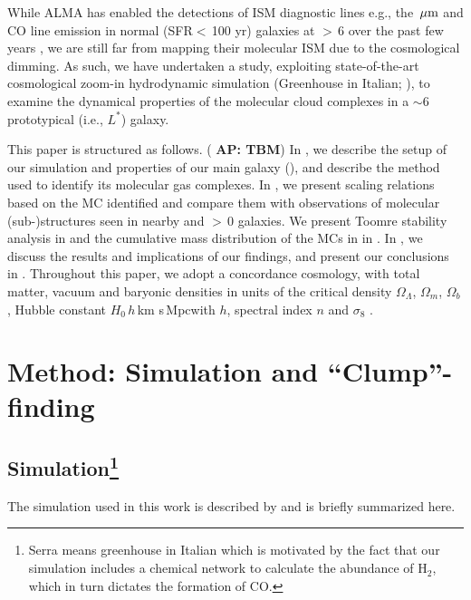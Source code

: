 \IfFileExists{emulateapjlegacy.cls}{\documentclass[iop]{emulateapjlegacy}}{\documentclass[iop]{emulateapj}}
\newcommand{\AP}[1]{({\bf \color{apcolor} AP: #1})}
\begin{document}
While ALMA has enabled the detections of
ISM diagnostic lines e.g., the \,$\mbox{$\mu$m}$ and CO line emission in
normal (SFR$<$\,100\,\Msun\,yr\pmOne) galaxies at \z$>$\,6 over the past few years \citep[e.g.,][]{Odorico18a, Carniani18b},
we are still far from mapping their molecular ISM due to the cosmological dimming.
As such, we have undertaken a study, exploiting
state-of-the-art cosmological zoom-in hydrodynamic simulation
 (Greenhouse in Italian; \citealt{Pallottini17a, Pallottini17b}), to examine
the dynamical properties of the molecular cloud complexes in a \z$\sim$6 prototypical (i.e., $L^*$) 
galaxy.

This paper is structured as follows.
\AP{TBM}
In , we describe the setup of our simulation and properties of our main galaxy (\flower),
and describe the method used to identify its molecular gas complexes.
In , we present scaling relations based on
the MC identified and compare them with observations of molecular
(sub-)structures seen in nearby and \z$>$\,0 galaxies.
We present Toomre stability analysis in  and
the cumulative mass distribution of the MCs in \flower in .
In , we discuss the results and implications of our findings,
and present our conclusions in .
Throughout this paper, we adopt a concordance cosmology, with total matter, vacuum and baryonic densities
in units of the critical density $\Omega_{\Lambda}$, $\Omega_m$, $\Omega_b$,
Hubble constant $H_0$\,$h$\,km s\pmOne\,Mpc\pmOne with $h$,
spectral index $n$ and $\sigma_8$ \citep{Planck14a}.


\section{Method: Simulation and ``Clump''-finding} \label{sec:sim}


\subsection{ Simulation\footnote{Serra means greenhouse in Italian which is motivated by the
fact that our simulation includes a chemical network to calculate the abundance of H$_2$, which in turn
dictates the formation of CO.
}}
The simulation used in this work is described by \citealt{Pallottini17a, Pallottini17b} and is briefly summarized here.
\end{document}
